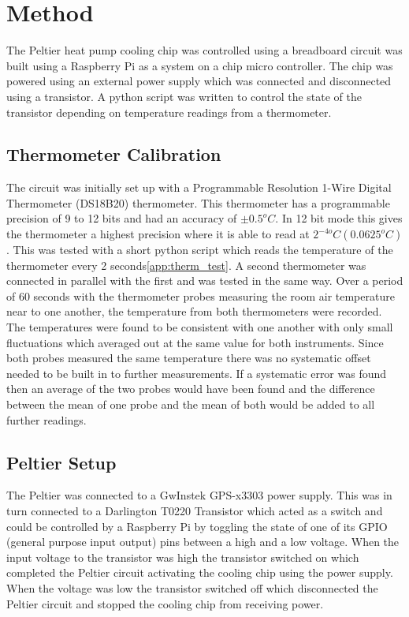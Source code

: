 \documentclass[10pt]{article}
\begin{document}
\section*{Method}
The Peltier heat pump cooling chip was controlled using a breadboard circuit was built using a Raspberry Pi\cite{rpi} as a system on a chip micro controller. The chip was powered using an external power supply which was connected and disconnected using a transistor. A python script was written to control the state of the transistor depending on temperature readings from a thermometer. \\

\subsection*{Thermometer Calibration}

The circuit was initially set up with a Programmable Resolution 1-Wire Digital Thermometer (DS18B20) thermometer\cite{thermometer}. This thermometer has a programmable precision of 9 to 12 bits and had an accuracy of $\pm 0.5^oC$. In 12 bit mode this gives the thermometer a highest precision where it is able to read at $2^{-4o} C (0.0625^o C)$. This was tested with a short python script which reads the temperature of the thermometer every 2 seconds\ref{app:therm_test}. A second thermometer was connected in parallel with the first and was tested in the same way. Over a period of 60 seconds with the thermometer probes measuring the room air temperature near to one another, the temperature from both thermometers were recorded. The temperatures were found to be consistent with one another with only small fluctuations which averaged out at the same value for both instruments. Since both probes measured the same temperature there was no systematic offset needed to be built in to further measurements. If a systematic error was found then an average of the two probes would have been found and the difference between the mean of one probe and the mean of both would be added to all further readings.\\

\subsection*{Peltier Setup}
The Peltier was connected to a GwInstek GPS-x3303 power supply\cite{powe_sup}. This was in turn connected to a Darlington T0220 Transistor\cite{trans} which acted as a switch and could be controlled by a Raspberry Pi by toggling the state of one of its GPIO (general purpose input output) pins between a high and a low voltage. When the input voltage to the transistor was high the transistor switched on which completed the Peltier circuit activating the cooling chip using the power supply. When the voltage was low the transistor switched off which disconnected the Peltier circuit and stopped the cooling chip from receiving power.\\
\end{document}

